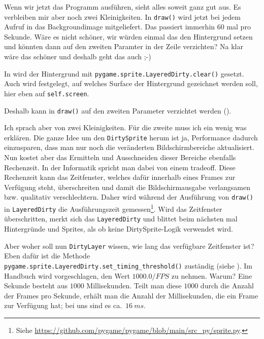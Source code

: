 

Wenn wir jetzt das Programm ausführen, sieht alles soweit ganz gut aus. Es verbleiben mir aber noch zwei Kleinigkeiten. In \texttt{draw()} wird jetzt bei jedem Aufruf in  das Backgroundimage mitgeliefert. Das passiert immerhin 60 mal pro Sekunde. Wäre es nicht schöner, wir würden einmal das den Hintergrund setzen und könnten dann auf den zweiten Paramter in der Zeile verzichten? Na klar wäre das schöner und deshalb geht das auch ;-)

In  wird der Hintergrund mit \texttt{pygame.sprite.LayeredDirty.clear()} gesetzt. Auch wird festgelegt, auf welches Surface der Hintergrund gezeichnet werden soll, hier eben auf \texttt{self.screen}.


Deshalb kann in \texttt{draw()} auf den zweiten Parameter verzichtet werden ().

\newpage
{} 

Ich sprach aber von zwei Kleinigkeiten. Für die zweite muss ich ein wenig was erklären. Die ganze Idee um den \texttt{DirtySprite} herum ist ja, Performance dadurch einzusparen, dass man nur noch die veränderten Bildschirmbereiche aktualisiert. Nun kostet aber das Ermitteln und Ausschneiden dieser Bereiche ebenfalls Rechenzeit. In der Informatik spricht man dabei von einem \gls{tradeoff}. Diese Rechenzeit kann das Zeitfenster, welches dafür innerhalb eines Frames zur Verfügung steht, überschreiten und damit die Bildschirmausgabe verlangsamen bzw. qualitativ verschlechtern. Daher wird während der Ausführung von \texttt{draw()} in \texttt{LayeredDirty} die Ausführungszeit gemessen\footnote{Siehe \url{https://github.com/pygame/pygame/blob/main/src_py/sprite.py}.}. Wird das Zeitfenster überschritten, merkt sich das \texttt{LayeredDirty} und blittet beim nächsten mal Hintergründe und Sprites, als ob keine DirtySprite-Logik verwendet wird. 

Aber woher soll nun \texttt{DirtyLayer} wissen, wie lang das verfügbare Zeitfenster ist? Eben dafür ist die Methode \texttt{pygame.sprite.LayeredDirty.set\-\_tim\-ing\-\_thres\-hold()} zuständig (siehe ). Im Handbuch wird vorgeschlagen, den Wert $1000.0 / FPS$ zu nehmen. Warum? Eine Sekunde besteht aus $1000$ Millisekunden. Teilt man diese $1000$ durch die Anzahl der Frames pro Sekunde, erhält man die Anzahl der Millisekunden, die ein Frame zur Verfügung hat; bei uns sind es ca.~$16~ms$.

